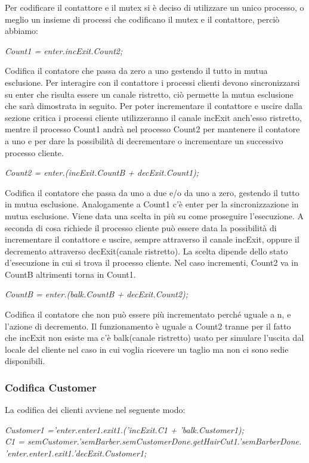 Per codificare il contattore e il mutex si è deciso di utilizzare un unico processo, o meglio un insieme di processi che codificano il mutex e il contattore, perciò abbiamo: 

\emph{Count1 = enter.incExit.Count2;}

Codifica il contatore che passa da zero a uno gestendo il tutto in mutua esclusione. Per interagire con il contattore i processi clienti devono sincronizzarsi su enter che risulta essere un canale ristretto, ciò permette la mutua esclusione che sarà dimostrata in seguito. Per poter incrementare il contattore e uscire dalla sezione critica i processi cliente utilizzeranno il canale incExit anch'esso ristretto, mentre il processo Count1 andrà nel processo Count2 per mantenere il contatore a uno e per dare la possibilità di decrementare o incrementare un successivo processo cliente.

\emph{Count2 = enter.(incExit.CountB + decExit.Count1);}

Codifica il contatore che passa da uno a due e/o da uno a zero, gestendo il tutto in mutua esclusione. Analogamente a Count1 c'è enter per la sincronizzazione in mutua esclusione. Viene data una scelta in più su come proseguire l'esecuzione. A seconda di cosa richiede il processo cliente può essere data la possibilità di incrementare il contattore e uscire, sempre attraverso il canale incExit, oppure il decremento attraverso decExit(canale ristretto). La scelta dipende dello stato d'esecuzione in cui si trova il processo cliente. Nel caso incrementi, Count2 va in CountB altrimenti torna in Count1.

\emph{CountB = enter.(balk.CountB + decExit.Count2);}

Codifica il contatore che non può essere più incrementato perché uguale a n, e l'azione di decremento. Il funzionamento è uguale a Count2 tranne per il fatto che incExit non esiste ma c'è balk(canale ristretto) usato per simulare l'uscita dal locale del cliente nel caso in cui voglia ricevere un taglio ma non ci sono sedie disponibili.

\subsubsection{Codifica Customer}

La codifica dei clienti avviene nel seguente modo:

\emph{Customer1 ='enter.enter1.exit1.('incExit.C1 + 'balk.Customer1);}\\
\emph{C1 = semCustomer.'semBarber.semCustomerDone.getHairCut1.'semBarberDone.}\\
\emph{'enter.enter1.exit1.'decExit.Customer1;}

